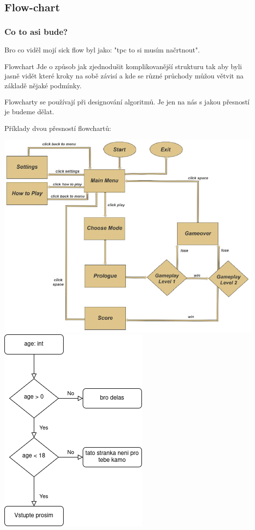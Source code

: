 \documentclass{beamer}
\begin{document}
\subsection{Flow-chart}
\label{sec:fde-cycle}

\begin{frame}
 \frametitle{Co to asi bude?}
 Bro co viděl mojí sick flow byl jako: "tpc to si musím načrtnout".
 \vfill
 \begin{block}{Flowchart}
  Jde o způsob jak zjednodušit komplikovanější strukturu tak aby byli jasně
  vidět které kroky na sobě závisí a kde se různé průchody můžou větvit na
  základě nějaké podmínky.
   \end{block}
 \vfill
   Flowcharty se používají při designování algoritmů. Je jen na nás s jakou
   přesností je budeme dělat. 
 
 \end{frame}

 \begin{frame}
  Příklady dvou přesností flowchartů:

  \begin{multicols}{2}
    \includegraphics[scale=0.25]{fcě.png}
   \columnbreak
    \includegraphics[scale=0.5]{fc.png}

  \end{multicols}
 \end{frame}
\end{document}
